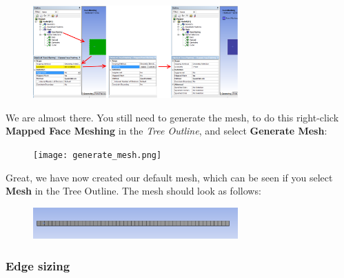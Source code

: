 \documentclass[11pt,a4paper,oneside]{scrartcl}
\newcommand\bfr[1]{\textcolor[rgb]{1,0.00,0.00}{\textbf{\textsf{#1}}}}
\begin{document}
\begin{figure}[H]
\begin{center}
\includegraphics[width=0.7\textwidth,clip]{apply_mfm.png}
\end{center}
\end{figure}
We are almost there. You still need to generate the mesh, to do this right-click \bfr{Mapped Face Meshing} in the \emph{Tree Outline}, and select \bfr{Generate Mesh}:

\begin{figure}[H]
\begin{center}
\texttt{[image: generate\_mesh.png]}
\end{center}
\end{figure}

Great, we have now created our default mesh, which can be seen if you select \bfr{Mesh} in the Tree Outline. The mesh should look as follows:
\begin{figure}[H]
\begin{center}
\includegraphics[width=0.7\textwidth,clip]{default_mesh.png}
\end{center}
\end{figure}

\subsubsection{Edge sizing}
\end{document}
